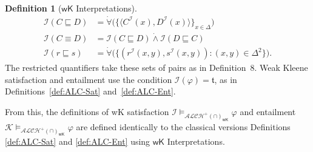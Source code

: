 \documentclass[letterpaper]{article} %
\theoremstyle{definition}
\theoremstyle{definition}
\newtheorem{definition}{Definition}
\theoremstyle{definition}
\theoremstyle{definition}
\theoremstyle{definition}
\newcommand{\vt}{\mathfrak{t}}
\begin{document}
\begin{definition}[$\mathsf{wK}$ Interpretations]
\begin{align*}
\mathcal{I}(C\sqsubseteq D)&=\dot{\forall}\bigl(\{\langle C^{\mathcal{I}}(x),D^{\mathcal{I}}(x)\rangle\}_{x\in\Delta}\bigr)\\
\mathcal{I}(C\equiv D)&=\mathcal{I}(C\sqsubseteq D)\mathrel{\dot{\wedge}}\mathcal{I}(D\sqsubseteq C)\\
\mathcal{I}(r\sqsubseteq s)&=\dot{\forall}\bigl(\{(r^{\mathcal{I}}(x,y),s^{\mathcal{I}}(x,y)):(x,y)\in\Delta^2\}\bigr).
\end{align*}
The restricted quantifiers take these sets of pairs as in Definition~8. Weak Kleene satisfaction and entailment use the condition $\mathcal{I}(\varphi)=\vt$, as in Definitions~\ref{def:ALC-Sat} and~\ref{def:ALC-Ent}.
\end{definition}
\noindent From this, the definitions of \textsf{wK} satisfaction $\mathcal{I}\models_{\mathcal{ALCH^+(\cap)}_\mathsf{wK}}\varphi$ and entailment $\mathcal{K}\models_{\mathcal{ALCH^+(\cap)}_\mathsf{wK}}\varphi$ are defined identically to the classical versions Definitions \ref{def:ALC-Sat} and \ref{def:ALC-Ent} using $\mathsf{wK}$ Interpretations.
\end{document}
